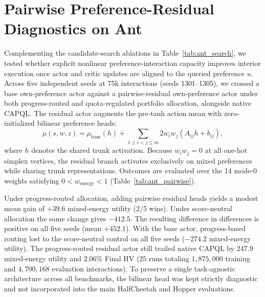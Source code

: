 \section{Pairwise Preference-Residual Diagnostics on Ant}
\label{app:ant_diagnostics}

Complementing the candidate-search ablations in Table~\ref{tab:ant_search}, we
tested whether explicit nonlinear preference-interaction capacity improves
interior execution once actor and critic updates are aligned to the queried
preference $u$. Across five independent seeds at 75k interactions
(seeds 1301--1305), we crossed a base own-preference actor against a
pairwise-residual own-preference actor under both progress-routed and
quota-regulated portfolio allocation, alongside native CAPQL. The residual
actor augments the pre-tanh action mean with zero-initialized bilinear
preference heads:
\begin{equation}
 \mu(s, w, z) = \mu_{\mathrm{base}}(h)
       + \sum_{1 \leq i < j \leq m} 2 w_i w_j (A_{ij} h + b_{ij}),
 \label{eq:pairwise_residual}
\end{equation}
where $h$ denotes the shared trunk activation. Because $w_i w_j = 0$ at all
one-hot simplex vertices, the residual branch activates exclusively on mixed
preferences while sharing trunk representations. Outcomes are evaluated over
the 14 mode-0 weights satisfying $0 < w_{\mathrm{energy}} < 1$
(Table~\ref{tab:ant_pairwise}).



Under progress-routed allocation, adding pairwise residual heads yields a modest
mean gain of $+39.6$ mixed-energy utility (2/5 wins). Under score-neutral
allocation the same change gives $-412.5$. The resulting difference in
differences is positive on all five seeds (mean $+452.1$). With the base
actor, progress-based routing lost to the score-neutral control on all five
seeds ($-274.2$ mixed-energy utility). The progress-routed residual actor
still trailed native CAPQL by $247.9$ mixed-energy utility and $2.06\%$ Final HV
($25$ runs totaling $1{,}875{,}000$ training and $4{,}700{,}168$ evaluation
interactions). To preserve a single task-agnostic architecture across all
benchmarks, the bilinear head was kept strictly diagnostic and not incorporated
into the main HalfCheetah and Hopper evaluations.
